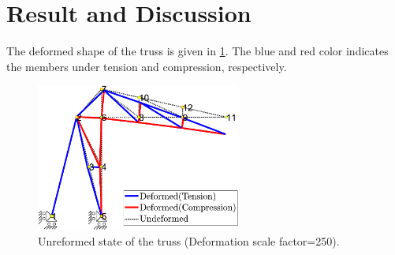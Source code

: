 \documentclass{article}
\begin{document}
\section{Result and Discussion}
The deformed shape of the truss is given in \cref{fig:truss_displacement}. The blue and red color indicates the members under tension and compression, respectively.


\begin{figure}[H]
    \centering
    \includegraphics[width = 0.6\textwidth ]{figures/truss_displacement.pdf}
    \caption{Unreformed state of the truss (Deformation scale factor=250).}
    \label{fig:truss_displacement}
\end{figure}


%
%
\end{document}
